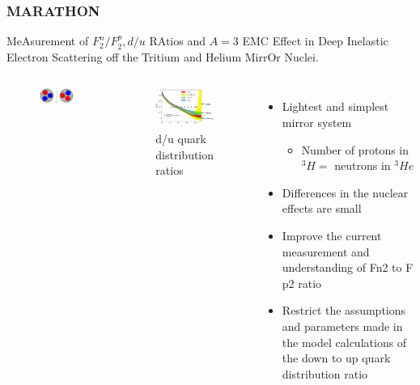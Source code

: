 \documentclass{beamer}
\begin{document}
\begin{frame}
\frametitle{MARATHON}
		MeAsurement of $F^n_2/F^p_2, d/u$ RAtios and $A=3$ EMC Effect in Deep Inelastic Electron Scattering off the Tritium and Helium MirrOr Nuclei.
	\vspace{-10pt}
	\begin{columns}[t]
	

		\begin{figure}
			\includegraphics[width =5cm]{../images/mirror}
		\end{figure}
		\vspace{-20pt}
		\begin{figure}
			\includegraphics[width=5cm]{../images/d_u}
			\caption{d/u quark distribution ratios}
		\end{figure}

		\begin{itemize}
			\item Lightest and simplest mirror system
			\begin{itemize}
				\item  Number of protons in $^3H =$ neutrons in $^3He$
	  		 \end{itemize}
			\item Differences in the nuclear effects are small
			\item Improve the current measurement and understanding of Fn2 to F p2 ratio
			\item Restrict the assumptions and parameters made in the model calculations of the down to up quark distribution ratio
		\end{itemize}


	\end{columns}
\end{frame}
\end{document}
